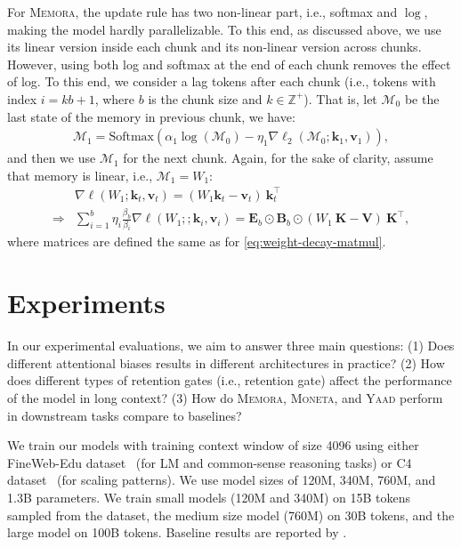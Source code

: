 \documentclass{article}
\newcommand{\citep}{\parencite}
\newcommand{\citet}{\textcite}
\newcommand{\ymodel}[0]{\textsc{Yaad}}
\newcommand{\mmodel}[0]{\textsc{Moneta}}
\newcommand{\xmodel}[0]{\textsc{Memora}}
\newcommand{\vk}[0]{\mathbf{k}}
\newcommand{\vvv}[0]{\mathbf{v}}
\newcommand{\M}[0]{\mathcal{M}}
\theoremstyle{plain}
\theoremstyle{definition}
\theoremstyle{remark}
\newcommand{\head}[1]{\vspace{1.7mm}\noindent{{\textcolor{c2}{\bf #1.}}}}
\begin{document}
For \xmodel, the update rule has two non-linear part, i.e., softmax and $\log$, making the model hardly parallelizable. To this end, as discussed above, we use its linear version inside each chunk and its non-linear version across chunks. However, using both log and softmax at the end of each chunk removes the effect of log. To this end, we consider a lag tokens after each chunk (i.e., tokens with index $i = k b + 1$, where $b$ is the chunk size and $k \in \mathbb{Z}^{+}$). That is, let $\M_0$ be the last state of the memory in previous chunk, we have:
\begin{align}
    \M_1 = \mbox{Softmax}\left( \alpha_1 \log(\M_{0})  - \eta_1  \nabla \ell_2(\M_{0};\vk_1, \vvv_1)\right),
\end{align}
and then we use $\M_1$ for the next chunk. Again, for the sake of clarity, assume that memory is linear, i.e.,  $\M_1 = W_1$:
\begin{align}
    &\nabla \ell(W_{1};\vk_t, \vvv_t) = (W_1 \vk_t - \vvv_t)\:\vk_t^{\top} \\ \label{eq:weight-decay-matmul2}
    \Rightarrow &\sum_{i = 1}^{b} \eta_i \frac{\beta_{b}}{\beta_{i}} \nabla \ell(W_{1}; ;\vk_i, \vvv_i)  =  \mathbf{E}_b \odot \mathbf{B}_b \odot (W_1 \: \mathbf{K} - \mathbf{V}) \: \mathbf{K}^{\top}, 
\end{align}
where matrices are defined the same as for \autoref{eq:weight-decay-matmul}.


\section{Experiments} \label{sec:exp}
In our experimental evaluations, we aim to answer three main questions: (1) Does different attentional biases results in different architectures in practice? (2) How does different types of retention gates (i.e., retention gate) affect the performance of the model in long context? (3) How do \xmodel, \mmodel, and \ymodel{} perform in downstream tasks compare to baselines?


\head{Setup}
We train our models with training context window of size 4096 using either FineWeb-Edu dataset~\citep{penedo2024the} (for LM and common-sense reasoning tasks) or C4 dataset~\citep{raffel2020exploring} (for scaling patterns). We use model sizes of 120M, 340M, 760M, and 1.3B parameters. We train small models (120M and 340M) on 15B tokens sampled from the dataset, the medium size model (760M) on 30B tokens, and the large model on 100B tokens. Baseline results are reported by \citet{behrouz2024titans}.
\end{document}
